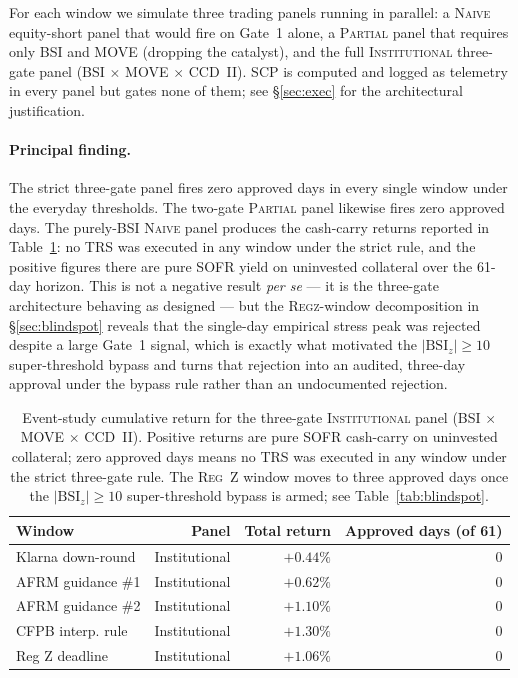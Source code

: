 \documentclass[11pt,letterpaper]{article}
\newcommand{\bsi}{\text{BSI}}
\begin{document}
For each window we simulate three trading panels running in parallel:
a \textsc{Naive} equity-short panel that would fire on Gate~1 alone,
a \textsc{Partial} panel that requires only BSI and MOVE (dropping
the catalyst), and the full \textsc{Institutional} three-gate panel
(BSI $\times$ MOVE $\times$ CCD~II). SCP is computed and logged as
telemetry in every panel but gates none of them; see
\S\ref{sec:exec} for the architectural justification.

\paragraph{Principal finding.}
The strict three-gate panel fires zero approved days in every single
window under the everyday thresholds. The two-gate \textsc{Partial}
panel likewise fires zero approved days. The purely-BSI
\textsc{Naive} panel produces the cash-carry returns
reported in Table~\ref{tab:backtest}: no TRS was executed in
any window under the strict rule, and the positive figures there are
pure SOFR yield on uninvested collateral over the 61-day horizon.
This is not a negative result \emph{per se} --- it is the three-gate
architecture behaving as designed --- but the \textsc{Regz}-window
decomposition in \S\ref{sec:blindspot} reveals that the single-day
empirical stress peak was rejected despite a large Gate~1 signal, which
is exactly what motivated the $|\bsi_z|\geq10$ super-threshold bypass
and turns that rejection into an audited, three-day approval under
the bypass rule rather than an undocumented rejection.

\begin{table}[H]
\centering
\small
\begin{tabular}{lrrr}
\toprule
\textbf{Window} & \textbf{Panel} & \textbf{Total return} &
\textbf{Approved days (of 61)}\\
\midrule
Klarna down-round & Institutional    & $+0.44\%$ & 0 \\
AFRM guidance \#1 & Institutional    & $+0.62\%$ & 0 \\
AFRM guidance \#2 & Institutional    & $+1.10\%$ & 0 \\
CFPB interp. rule & Institutional    & $+1.30\%$ & 0 \\
Reg Z deadline    & Institutional    & $+1.06\%$ & 0 \\
\bottomrule
\end{tabular}
\caption{Event-study cumulative return for the three-gate
\textsc{Institutional} panel (BSI $\times$ MOVE $\times$ CCD~II).
Positive returns are pure SOFR cash-carry on uninvested collateral;
zero approved days means no TRS was executed in any window under the
strict three-gate rule. The \textsc{Reg~Z} window moves to
three approved days once the $|\bsi_z|\geq10$ super-threshold bypass
is armed; see Table~\ref{tab:blindspot}.}
\label{tab:backtest}
\end{table}
\end{document}
